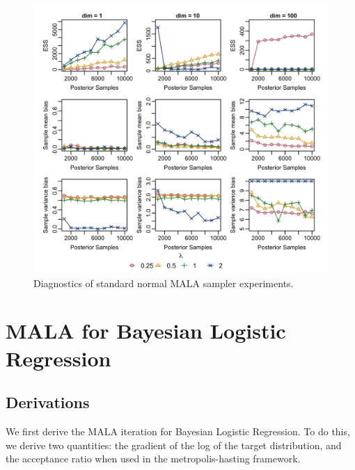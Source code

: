 \documentclass{article}
\begin{document}
\begin{figure}
\centering
\includegraphics[width=.8\textwidth]{MALA_std_normal/mala_std_normal_diagnostics.png}
\caption{Diagnostics of standard normal MALA sampler experiments.}
\label{fig:mala_std_normal}
\end{figure}

\section{MALA for Bayesian Logistic Regression}

\subsection{Derivations}

We first derive the MALA iteration for Bayesian Logistic Regression. 
To do this, we derive two quantities: the gradient of the log of the target distribution, 
and the acceptance ratio when used in the metropolis-hasting framework.
\end{document}
